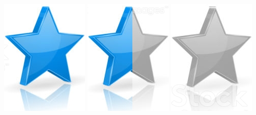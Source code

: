 \documentclass[10pt,a4paper,sans]{article}
\begin{document}
\begin{minipage}[t]{0.28\textwidth}
\begin{mdframed}[style=cadreCompetences]
\begin{itemize}
{                    \includegraphics[scale=0.20]{img/star.png} \hspace{-0.2cm}
                    \includegraphics[scale=0.20]{img/half_star.png} \hspace{-0.2cm}
                    \includegraphics[scale=0.20]{img/empty_star.png}}
            \end{itemize}

\end{mdframed}
\end{minipage}
\end{document}

